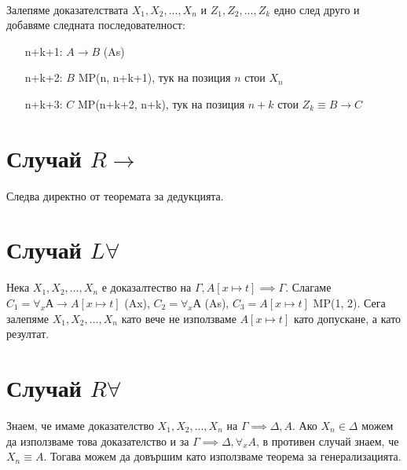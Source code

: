 \documentclass[12pt]{article}
\begin{document}
\paragraph*{}
Залепяме доказателствата $X_1, X_2, ..., X_n$ и $Z_1, Z_2, ..., Z_k$ едно след друго и добавяме следната последователност:
\begin{itemize}[itemindent=4em]
    \item[n+k+1: ] $A \rightarrow B$ (As)
    \item[n+k+2: ] $B$ MP(n, n+k+1), тук на позиция $n$ стои $X_n$  
    \item[n+k+3: ] $C$ MP(n+k+2, n+k), тук на позиция $n+k$ стои $Z_k \equiv B \rightarrow C$  
\end{itemize}

\section*{Случай $R \rightarrow$}
Следва директно от теоремата за дедукцията.

\section*{Случай $L \forall$}
Нека $X_1, X_2, ..., X_n$ е доказалтество на $\Gamma, A[x \longmapsto t] \implies \Gamma$. Слагаме $C_1 = \forall_x А \rightarrow A[x \longmapsto t]$ (Ax), $C_2 = \forall_x А$ (As), $C_3 = A[x \longmapsto t]$ MP(1, 2). Сега залепяме $X_1, X_2, ..., X_n$ като вече не използваме $A[x \longmapsto t]$ като допускане, а като резултат.

\section*{Случай $R \forall$}
Знаем, че имаме доказателство $X_1, X_2, ..., X_n$ на $\Gamma \implies \Delta, A$. Ако $X_n \in \Delta$ можем да използваме това доказателство и за $\Gamma \implies \Delta, \forall_x A$, в противен случай знаем, че $X_n \equiv A$. Тогава можем да довършим като използваме теорема за генерализацията.
\end{document}
